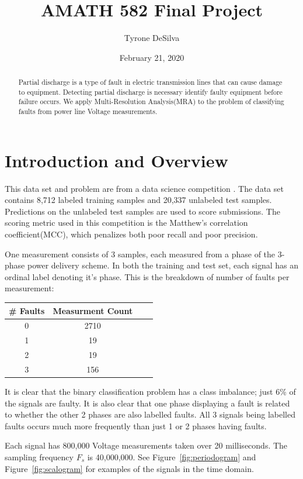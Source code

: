 \documentclass{article}
\title{AMATH 582 Final Project}
\author{Tyrone DeSilva}
\date{February 21, 2020}
\begin{document}
\maketitle

\begin{abstract}
    Partial discharge is a type of fault in electric transmission lines that can
    cause damage to equipment. Detecting partial discharge is necessary identify faulty
    equipment before failure occurs. We apply Multi-Resolution Analysis(MRA) to
    the problem of classifying faults from power line Voltage measurements.
\end{abstract}

\section{Introduction and Overview}
This data set and problem are from a data science competition \cite{vsb_data}.
The data set contains 8,712 labeled training samples and 20,337 unlabeled test
samples. Predictions on the unlabeled test samples are used to score
submissions. The scoring metric used in this competition is the Matthew's
correlation coefficient(MCC), which penalizes both poor recall and poor precision.

One measurement consists of 3 samples, each measured from a phase of the
3-phase power delivery scheme. In both the training and test set, each signal
has an ordinal label denoting it's phase. This is the breakdown of number of faults per measurement:
\begin{center}
\begin{tabular}{ |c|c|c|c| } 
\hline
\# Faults & Measurment Count \\
\hline
0 & 2710 \\ 
1 & 19 \\
2 & 19 \\
3 & 156 \\
\hline
\end{tabular}
\end{center}

It is clear that the binary classification problem has a class
imbalance; just 6\% of the signals are faulty.
It is also clear that one phase displaying a fault is related
to whether the other 2 phases are also labelled faults. All 3 signals being
labelled faults occurs much more frequently than just 1 or 2 phases having faults.

Each signal has 800,000 Voltage measurements taken over 20 milliseconds. The
sampling frequency $F_s$ is 40,000,000. See Figure~\ref{fig:periodogram} and
Figure~\ref{fig:scalogram} for examples of the signals in the time domain.
\end{document}

